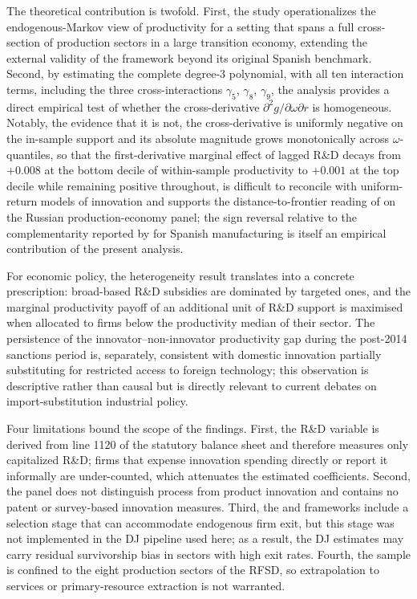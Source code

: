 \documentclass[a4paper, 12pt]{article}
\begin{document}
The theoretical contribution is twofold. First, the study operationalizes the endogenous-Markov view of productivity for a setting that spans a full cross-section of production sectors in a large transition economy, extending the external validity of the \textcite{doraszelski2013r} framework beyond its original Spanish benchmark. Second, by estimating the complete degree-3 polynomial, with all ten interaction terms, including the three cross-interactions $\gamma_5$, $\gamma_8$, $\gamma_9$, the analysis provides a direct empirical test of whether the cross-derivative $\partial^2 g/\partial\omega\partial r$ is homogeneous. Notably, the evidence that it is not, the cross-derivative is uniformly negative on the in-sample support and its absolute magnitude grows monotonically across $\omega$-quantiles, so that the first-derivative marginal effect of lagged R\&D decays from $+0.008$ at the bottom decile of within-sample productivity to $+0.001$ at the top decile while remaining positive throughout, is difficult to reconcile with uniform-return models of innovation and supports the distance-to-frontier reading of \textcite{aghion1990model} on the Russian production-economy panel; the sign reversal relative to the complementarity reported by \textcite{doraszelski2013r} for Spanish manufacturing is itself an empirical contribution of the present analysis.


For economic policy, the heterogeneity result translates into a concrete prescription: broad-based R\&D subsidies are dominated by targeted ones, and the marginal productivity payoff of an additional unit of R\&D support is maximised when allocated to firms below the productivity median of their sector. The persistence of the innovator--non-innovator productivity gap during the post-2014 sanctions period is, separately, consistent with domestic innovation partially substituting for restricted access to foreign technology; this observation is descriptive rather than causal but is directly relevant to current debates on import-substitution industrial policy.


Four limitations bound the scope of the findings. First, the R\&D variable is derived from line 1120 of the statutory balance sheet and therefore measures only capitalized R\&D; firms that expense innovation spending directly or report it informally are under-counted, which attenuates the estimated coefficients. Second, the panel does not distinguish process from product innovation and contains no patent or survey-based innovation measures. Third, the \textcite{olley1992dynamics} and \textcite{levinsohn2003estimating} frameworks include a selection stage that can accommodate endogenous firm exit, but this stage was not implemented in the DJ pipeline used here; as a result, the DJ estimates may carry residual survivorship bias in sectors with high exit rates. Fourth, the sample is confined to the eight production sectors of the RFSD, so extrapolation to services or primary-resource extraction is not warranted.
\end{document}
